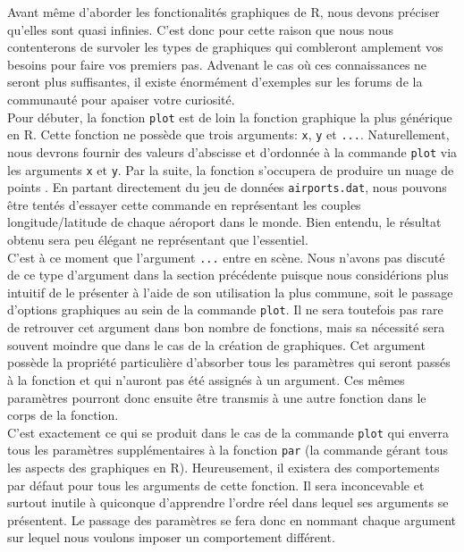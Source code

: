 Avant même d'aborder les fonctionalités graphiques de R, nous devons préciser qu'elles sont quasi infinies. C'est donc pour cette raison que nous nous contenterons de survoler les types de graphiques qui combleront amplement vos besoins pour faire vos premiers pas. Advenant le cas où ces connaissances ne seront plus suffisantes, il existe énormément d'exemples sur les forums de la communauté pour apaiser votre curiosité. \\

Pour débuter, la fonction \texttt{plot} \cite{Rfunction:plot} est de loin la fonction graphique la plus générique en R. Cette fonction ne possède que trois arguments: \texttt{x}, \texttt{y} et \texttt{...}. Naturellement, nous devrons fournir des valeurs d'abscisse et d'ordonnée à la commande \texttt{plot} via les arguments \texttt{x} et \texttt{y}. Par la suite, la fonction s'occupera de produire un nuage de points . En partant directement du jeu de données \texttt{airports.dat}, nous pouvons être tentés d'essayer cette commande en représentant les couples longitude/latitude de chaque aéroport dans le monde. Bien entendu, le résultat obtenu sera peu élégant ne représentant que l'essentiel. \\

C'est à ce moment que l'argument \texttt{...} entre en scène. Nous n'avons pas discuté de ce type d'argument dans la section précédente puisque nous considérions plus intuitif de le présenter à l'aide de son utilisation la plus commune, soit le passage d'options graphiques au sein de la commande \texttt{plot}. Il ne sera toutefois pas rare de retrouver cet argument dans bon nombre de fonctions, mais sa nécessité sera souvent moindre que dans le cas de la création de graphiques. Cet argument possède la propriété particulière d'absorber tous les paramètres qui seront passés à la fonction et qui n'auront pas été assignés à un argument. Ces mêmes paramètres pourront donc ensuite être transmis à une autre fonction dans le corps de la fonction. \\

C'est exactement ce qui se produit dans le cas de la commande \texttt{plot} qui enverra tous les paramètres supplémentaires à la fonction \texttt{par} \cite{Rfunction:par} (la commande gérant tous les aspects des graphiques en R). Heureusement, il existera des comportements par défaut pour tous les arguments de cette fonction. Il sera inconcevable et surtout inutile à quiconque d'apprendre l'ordre réel dans lequel ses arguments se présentent. Le passage des paramètres se fera donc en nommant chaque argument sur lequel nous voulons imposer un comportement différent. \\


